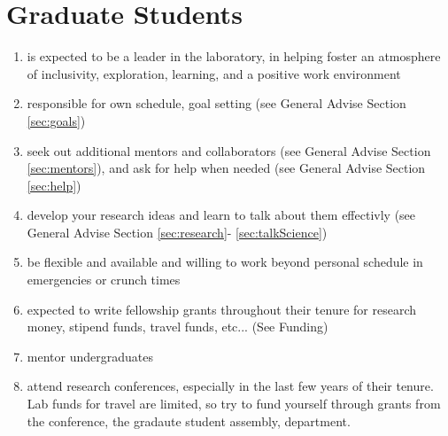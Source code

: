 \documentclass[12pt]{article}
\begin{document}
\section{Graduate Students}
\begin{enumerate}
\item is expected to be a leader in the laboratory, in helping foster
  an atmosphere of inclusivity, exploration, learning, and a positive
  work environment
\item responsible for own schedule, goal setting (see General Advise
  Section \ref{sec:goals})
\item seek out additional mentors and collaborators (see General
  Advise Section \ref{sec:mentors}), and ask for help when needed (see
  General Advise Section \ref{sec:help})
\item develop your research ideas and learn to talk about them
  effectivly (see General Advise Section \ref{sec:research}-
  \ref{sec:talkScience})
\item be flexible and available and willing to work beyond personal
  schedule in emergencies or crunch times
\item expected to write fellowship grants throughout their tenure for
  research money, stipend funds, travel funds, etc... (See Funding)
\item mentor undergraduates
\item attend research conferences, especially in the last few years of
  their tenure. Lab funds for travel are limited, so try to fund
  yourself through grants from the conference, the gradaute student
  assembly, department.
\end{enumerate}
\end{document}
